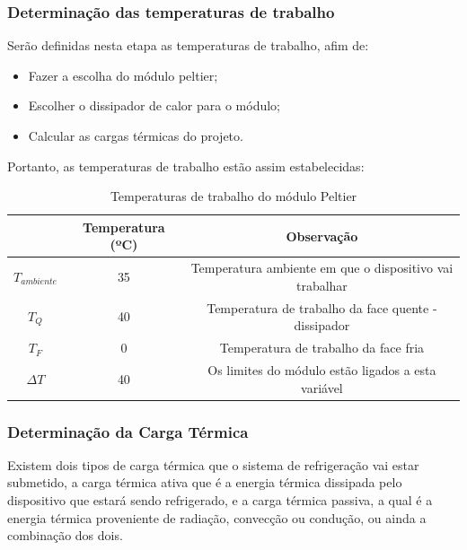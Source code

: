 \subsubsection{Determinação das temperaturas de trabalho}
Serão definidas nesta etapa as temperaturas de trabalho, afim de:
\begin{itemize}
	\item Fazer a escolha do módulo peltier;
    \item Escolher o dissipador de calor para o módulo;
    \item Calcular as cargas térmicas do projeto. 
\end{itemize}
Portanto, as temperaturas de trabalho estão assim estabelecidas:
\begin{table}[H]
\caption{ Temperaturas de trabalho do módulo Peltier}
\begin{tabular}{c|c|c}
     &  \textbf{Temperatura (ºC)} & \textbf{Observação}\\
   \hline
   $T_{ambiente}$ & 35 & Temperatura ambiente em que o dispositivo vai trabalhar \\
   $T_Q$ & 40  & 
Temperatura de trabalho da face quente - dissipador \\
$T_F$ & 0 & Temperatura de trabalho da face fria \\
$\Delta T$ & 40 & 
Os limites do módulo estão ligados a esta variável\\
\hline
\end{tabular}
\end{table}

\subsubsection{Determinação da Carga Térmica}
Existem dois tipos de carga térmica que o sistema de refrigeração vai estar submetido, a carga térmica ativa que é a energia térmica dissipada pelo dispositivo que estará sendo refrigerado, e a carga térmica passiva, a qual é a energia térmica proveniente de radiação, convecção ou condução, ou ainda a combinação dos dois. 

